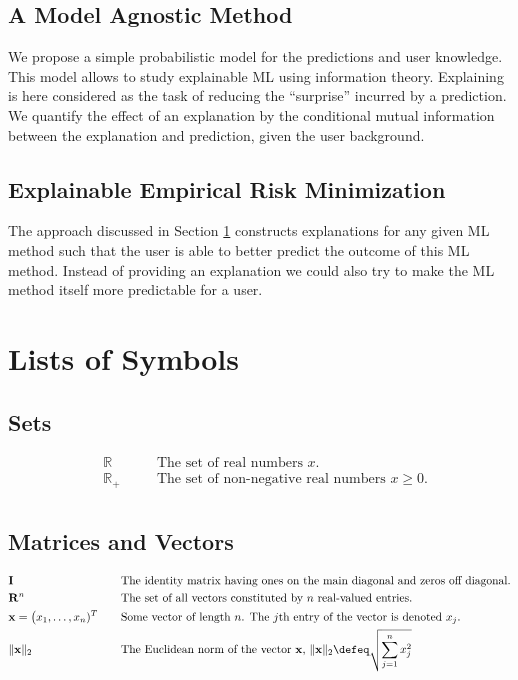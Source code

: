 \documentclass[12pt]{report}
\begin{document}
\section{A Model Agnostic Method}
\label{sec_model_agn_xml}

We propose a simple probabilistic model for the predictions and 
user knowledge. This model allows to study explainable ML using 
information theory. Explaining is here considered as the task of 
reducing the ``surprise'' incurred by a prediction. We quantify 
the effect of an explanation by the conditional mutual information 
between the explanation and prediction, given the user background. 

\section{Explainable Empirical Risk Minimization} 
The approach discussed in Section \ref{sec_model_agn_xml} constructs explanations 
for any given ML method such that the user is able to better predict 
the outcome of this ML method. Instead of providing an explanation 
we could also try to make the ML method itself more predictable for 
a user. 


\chapter{Lists of Symbols}

\section{Sets} 
\begin{align} 
&\mathbb{R}  &\quad &\mbox{The set of real numbers $x$.} \nonumber \\
&\mathbb{R}_{+}  &\quad &\mbox{The set of non-negative real numbers $x\geq0$.} \nonumber \\ \nonumber
\end{align} 

\section{Matrices and Vectors} 
\begin{align} 
&\mathbf{I}  &\quad &\mbox{The identity matrix having ones on the main diagonal and zeros off diagonal.} \nonumber \\
&\mathbf{R}^{n}  &\quad &\mbox{The set of all vectors constituted by $n$ real-valued entries.} \nonumber \\
&\mathbf{x}=\big(x_{1},\ldots,x_{n})^{T}  &\quad &\mbox{Some vector of length $n$. The $j$th entry of the vector is denoted $x_{j}$.} \nonumber \\
&\| \mathbf{x}\|_{2}  &\quad &\mbox{The Euclidean norm of the vector $\mathbf{x}$, } \| \mathbf{x}\|_{2} \defeq \sqrt{\sum_{j=1}^{n} x_{j}^{2}} \nonumber 
\end{align} 
\end{document}
